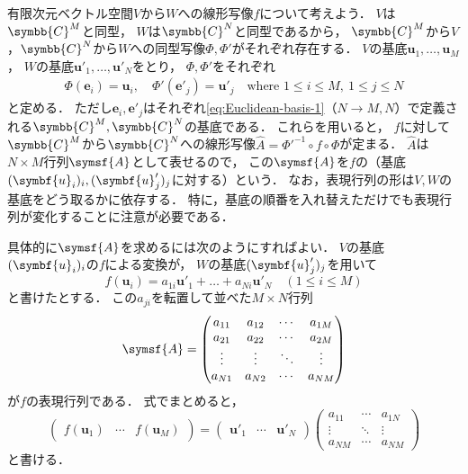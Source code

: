 \documentclass[
]{sotsu}
\begin{document}
有限次元ベクトル空間$V$から$W$への線形写像$f$について考えよう．
$V$は$\symbb{C}^M$と同型，
$W$は$\symbb{C}^N$と同型であるから，
$\symbb{C}^M$から$V$，$\symbb{C}^N$から$W$への同型写像$\Phi, \Phi'$がそれぞれ存在する．
$V$の基底$\symbf{u}_1, \dots, \symbf{u}_M$，
$W$の基底$\symbf{u}'_1, \dots, \symbf{u}'_N$をとり，
$\Phi, \Phi'$をそれぞれ
\begin{align*}
    \Phi(\symbf{e}_i) = \symbf{u}_i,
    \quad 
    \Phi'(\symbf{e}'_j) = \symbf{u}'_j
    \quad 
    \text{where }
    1 \leq i \leq M, \  
    1 \leq j \leq N
\end{align*}
と定める．
ただし$\symbf{e}_i, \symbf{e}'_j$はそれぞれ\cref{eq:Euclidean-basis-1}（$N \to M, N$）で定義される$\symbb{C}^M, \symbb{C}^N$の基底である．
これらを用いると，
$f$に対して$\symbb{C}^M$から$\symbb{C}^N$への線形写像$\hat{A} = \Phi'^{-1} \circ f \circ \Phi$が定まる．
$\hat{A}$は$N \times M$行列$\symsf{A}$として表せるので，
この$\symsf{A}$を$f$の（基底$\sequ{\symbf{u}_i}[i], \sequ{\symbf{u}'_j}[j]$に対する）という．
なお，表現行列の形は$V, W$の基底をどう取るかに依存する．
特に，基底の順番を入れ替えただけでも表現行列が変化することに注意が必要である．

具体的に$\symsf{A}$を求めるには次のようにすればよい．
$V$の基底$\sequ{\symbf{u}_i}[i]$の$f$による変換が，
$W$の基底$\sequ{\symbf{u}'_j}[j]$を用いて
\begin{equation*}
    f(\symbf{u}_i) = a_{1i} \symbf{u}'_1 + \dots + a_{Ni} \symbf{u}'_N
    \quad 
    (1 \leq i \leq M)
\end{equation*}
と書けたとする．
この$a_{ji}$を転置して並べた$M \times N$行列
\begin{equation*}
    \symsf{A} = 
    \begin{pmatrix}
        a_{11}  &  a_{12}  &  \cdots  &  a_{1M}  \\
        a_{21}  &  a_{22}  &  \cdots  &  a_{2M}  \\
        \vdots  &  \vdots  &  \ddots  &  \vdots  \\
        a_{N1}  &  a_{N2}  &  \cdots  &  a_{NM}
    \end{pmatrix}
\end{equation*}
が$f$の表現行列である．
式でまとめると，
\begin{equation*}
    \begin{pmatrix}
        f(\symbf{u}_1)  &  \cdots  &  f(\symbf{u}_M)
    \end{pmatrix}
    =
    \begin{pmatrix}
        \symbf{u}'_1  &  \cdots  &  \symbf{u}'_N
    \end{pmatrix}
    \begin{pmatrix}
        a_{11}  &  \cdots  &  a_{1N}  \\
        \vdots  &  \ddots  &  \vdots  \\
        a_{NM}  &  \cdots  &  a_{NM}
    \end{pmatrix}
\end{equation*}
と書ける．
\end{document}
